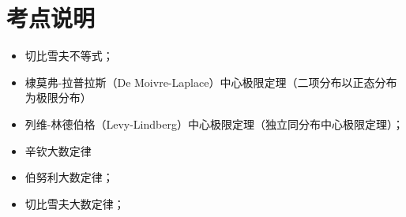 \section{考点说明}
\begin{itemize}
\item 切比雪夫不等式；
\item 棣莫弗-拉普拉斯（De Moivre-Laplace）中心极限定理（二项分布以正态分布为极限分布）
\item 列维-林德伯格（Levy-Lindberg）中心极限定理（独立同分布中心极限定理）；
\item 辛钦大数定律
\item 伯努利大数定律；
\item 切比雪夫大数定律；
\end{itemize}

